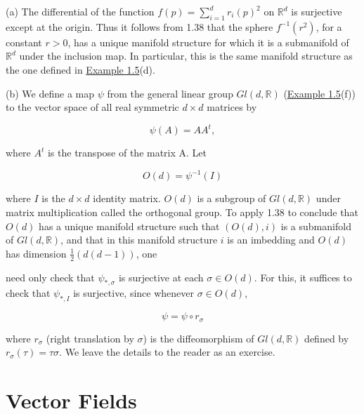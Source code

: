 \begin{examples}\label{thm:1.40}
	(a) The differential of the function $f(p) = \sum_{i=1}^{d} r_i(p)^2$ on $\mathbb{R}^d$ is surjective except at the origin. Thus it follows from 1.38 that the sphere $f^{-1}(r^2)$, for a constant $r > 0$, has a unique manifold structure for which it is a submanifold of $\mathbb{R}^d$ under the inclusion map. In particular, this is the same manifold structure as the one defined in \hyperref[thm:1.5]{Example 1.5}(d).

	(b) We define a map $\psi$ from the general linear group $Gl(d, \mathbb{R})$ (\hyperref[thm:1.5]{Example 1.5}(f)) to the vector space of all real symmetric $d \times d$ matrices by

	\[
		\psi(A)=A A^{t},
	\]

	where  $ A^{t} $ is the transpose of the matrix A. Let

	\[
		O(d)=\psi^{-1}(I)
	\]

	where $I$ is the $d \times d$ identity matrix. $O(d)$ is a subgroup of $Gl(d,\mathbb{R})$ under matrix multiplication called the orthogonal group. To apply 1.38 to conclude that $O(d)$ has a unique manifold structure such that $(O(d),i)$ is a submanifold of $Gl(d,\mathbb{R})$, and that in this manifold structure $i$ is an imbedding and $O(d)$ has dimension $\frac{1}{2}(d(d-1))$, one 

	need only check that  $ \psi_{*,\sigma} $ is surjective at each  $ \sigma \in O(d) $. For this, it suffices to check that  $ \psi_{*,I} $ is surjective, since whenever  $ \sigma \in O(d) $,

	\[
		\psi=\psi\circ r_{\sigma}
	\]

	where  $ r_{\sigma} $ (right translation by  $ \sigma $) is the diffeomorphism of  $ Gl(d, \mathbb{R}) $ defined by  $ r_{\sigma}(\tau) = \tau\sigma $. We leave the details to the reader as an exercise.

\end{examples}

\section{Vector Fields}



